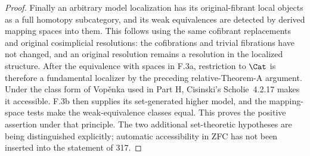 \begin{proof}
Finally an arbitrary model localization has its original-fibrant
local objects as a full homotopy subcategory, and its weak
equivalences are detected by derived mapping spaces into them.
This follows using the same cofibrant replacements and original
cosimplicial resolutions: the cofibrations and trivial fibrations
have not changed, and an original resolution remains a resolution
in the localized structure. After the equivalence with spaces in
F.3a, restriction to $\Cat$ is therefore a fundamental localizer
by the preceding relative-Theorem-A argument. Under the class
form of Vop\v{e}nka used in Part H, Cisinski's Scholie~4.2.17
makes it accessible. F.3b then supplies its set-generated higher
model, and the mapping-space tests make the weak-equivalence
classes equal. This proves the positive assertion under that
principle. The two additional set-theoretic hypotheses are being
distinguished explicitly; automatic accessibility in ZFC has not
been inserted into the statement of 317.
\end{proof}

